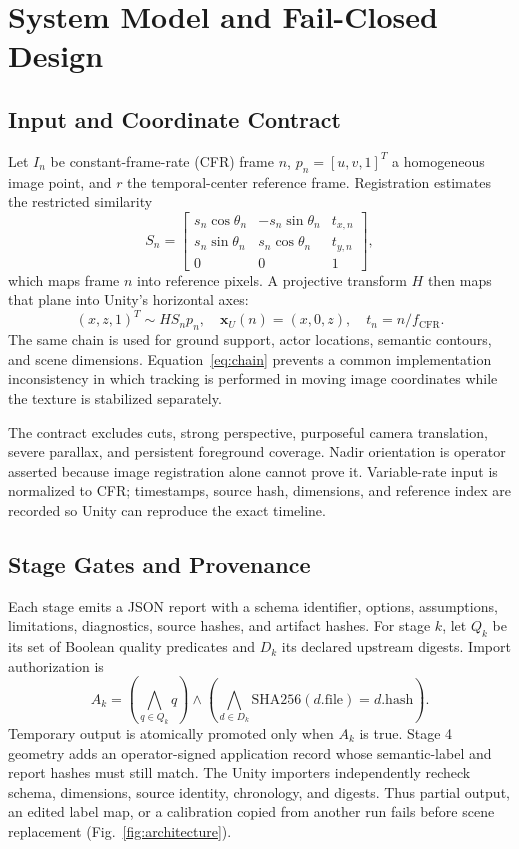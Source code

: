\documentclass[letterpaper,conference]{IEEEtran}
\begin{document}
\section{System Model and Fail-Closed Design}
\subsection{Input and Coordinate Contract}
Let $I_n$ be constant-frame-rate (CFR) frame $n$, $p_n=[u,v,1]^T$ a homogeneous image point, and $r$ the temporal-center reference frame. Registration estimates the restricted similarity
\begin{equation}
S_n=\begin{bmatrix}
s_n\cos\theta_n&-s_n\sin\theta_n&t_{x,n}\\
s_n\sin\theta_n&s_n\cos\theta_n&t_{y,n}\\0&0&1
\end{bmatrix},
\end{equation}
which maps frame $n$ into reference pixels. A projective transform $H$ then maps that plane into Unity's horizontal axes:
\begin{equation}
(x,z,1)^T \sim H S_n p_n,\quad
\mathbf{x}_{U}(n)=(x,0,z),\quad t_n=n/f_{\mathrm{CFR}}.
\label{eq:chain}
\end{equation}
The same chain is used for ground support, actor locations, semantic contours, and scene dimensions. Equation~\eqref{eq:chain} prevents a common implementation inconsistency in which tracking is performed in moving image coordinates while the texture is stabilized separately.

The contract excludes cuts, strong perspective, purposeful camera translation, severe parallax, and persistent foreground coverage. Nadir orientation is operator asserted because image registration alone cannot prove it. Variable-rate input is normalized to CFR; timestamps, source hash, dimensions, and reference index are recorded so Unity can reproduce the exact timeline.

\subsection{Stage Gates and Provenance}
Each stage emits a JSON report with a schema identifier, options, assumptions, limitations, diagnostics, source hashes, and artifact hashes. For stage $k$, let $Q_k$ be its set of Boolean quality predicates and $D_k$ its declared upstream digests. Import authorization is
\begin{equation}
A_k=\left(\bigwedge_{q\in Q_k}q\right)\land
    \left(\bigwedge_{d\in D_k}\mathrm{SHA256}(d.\mathrm{file})=d.\mathrm{hash}\right).
\label{eq:gate}
\end{equation}
Temporary output is atomically promoted only when $A_k$ is true. Stage 4 geometry adds an operator-signed application record whose semantic-label and report hashes must still match. The Unity importers independently recheck schema, dimensions, source identity, chronology, and digests. Thus partial output, an edited label map, or a calibration copied from another run fails before scene replacement (Fig.~\ref{fig:architecture}).
\end{document}
